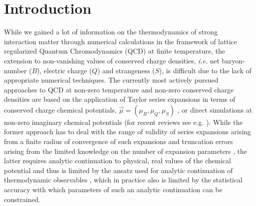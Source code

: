 \documentclass[pdflatex,prd,twocolumn,showpacs,superscriptaddress,nofootinbib]{revtex4-1}
\begin{document}

\maketitle

\section{Introduction}

While we gained a lot of information on the thermodynamics of strong interaction matter through
numerical calculations in the framework of lattice
regularized Quantum Chromodynamics (QCD) at finite 
temperature, the extension to non-vanishing values of
conserved charge densities, {\it i.e.} net baryon-number ($B$), electric charge ($Q$) and strangeness ($S$), 
is difficult due to the lack of appropriate numerical techniques. The currently most actively pursued approaches to QCD at non-zero temperature and non-zero
conserved charge densities are based on the application of 
Taylor series expansions in terms of conserved charge
chemical potentials, $\vec{\mu}=(\mu_B, \mu_Q, \mu_S)$ \cite{Gavai:2004sd,Allton:2005gk},
or direct simulations at non-zero imaginary chemical potentials \cite{DElia:2002tig,Bellwied:2015rza} (for recent reviews see e.g. \cite{Ding:2015ona,DElia:2018fjp,Guenther:2022wcr}). While the former 
approach has to deal with the range of validity of series expansions arising
from a finite radius of convergence of such expansions and truncation errors arising from the limited knowledge
on the number of expansion parameters
\cite{Karsch:2010hm}, the latter requires analytic continuation to physical, real
values of the chemical potential and thus is limited 
by the ansatz used for analytic continuation of thermodynamic observables \cite{Guenther:2017hnx,Bonati:2018nut}, which in practice also is 
limited by the statistical accuracy with which parameters of such an analytic continuation can be constrained.
\end{document}
